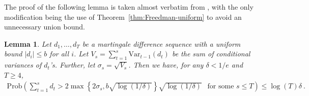 \documentclass{article}
\newtheorem{lemma}{Lemma}
\newcommand{\var}{\text{Var}}
\newcommand{\Prob}[1]{{\mathrm{Prob} \left(#1\right)}}
\begin{document}
The proof of the following lemma is taken almost verbatim from \cite{bartlett2008high}, with the only modification being the use of Theorem~\ref{thm:Freedman-uniform} to avoid an unnecessary union bound.
\begin{lemma}
\label{lem:fromFreedman}
Let $d_1,\ldots,d_T$ be a martingale difference sequence with a uniform bound $|d_i| \leq b$ for all $i$. Let
$V_s = \sum_{t=1}^s \var_{t-1} (d_t)$ be the sum of conditional variances of $d_t$'s. Further, let $\sigma_s = \sqrt{V_s}$.
Then we have, for any $\delta < 1/e$ and $T \ge 4$,
\begin{align}
\Prob{ \sum_{t=1}^s d_t > 2 \max\left\{ 2 \sigma_s, b\sqrt{\log(1/\delta)} \right\} \sqrt{\log(1/\delta)}  ~~\mbox{ for some } s\leq T} \le \log(T) \delta\ .
\end{align}
\end{lemma}
\end{document}
